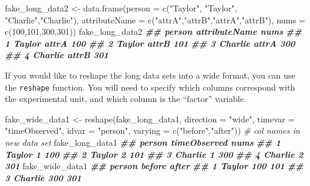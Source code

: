 \documentclass[
  12pt,
]{krantz}
\makeatletter
\newenvironment{Shaded}{\begin{snugshade}}{\end{snugshade}}
\newcommand{\AttributeTok}[1]{\textcolor[rgb]{0.61,0.61,0.61}{#1}}
\newcommand{\CommentTok}[1]{\textcolor[rgb]{0.37,0.37,0.37}{\textit{#1}}}
\newcommand{\DecValTok}[1]{\textcolor[rgb]{0.06,0.06,0.06}{#1}}
\newcommand{\DocumentationTok}[1]{\textcolor[rgb]{0.37,0.37,0.37}{\textbf{\textit{#1}}}}
\newcommand{\FunctionTok}[1]{\textcolor[rgb]{0,0,0}{#1}}
\newcommand{\NormalTok}[1]{#1}
\newcommand{\OtherTok}[1]{\textcolor[rgb]{0.37,0.37,0.37}{#1}}
\newcommand{\StringTok}[1]{\textcolor[rgb]{0.5,0.5,0.5}{#1}}
\newenvironment{kframe}{%
\medskip{}
\setlength{\fboxsep}{.8em}
 \def\at@end@of@kframe{}%
 \ifinner\ifhmode%
  \def\at@end@of@kframe{\end{minipage}}%
  \begin{minipage}{\columnwidth}%
 \fi\fi%
 \def\FrameCommand##1{\hskip\@totalleftmargin \hskip-\fboxsep
 \colorbox{shadecolor}{##1}\hskip-\fboxsep
     \hskip-\linewidth \hskip-\@totalleftmargin \hskip\columnwidth}%
 \MakeFramed {\advance\hsize-\width
   \@totalleftmargin\z@ \linewidth\hsize
   \@setminipage}}%
 {\par\unskip\endMakeFramed%
 \at@end@of@kframe}
\renewenvironment{Shaded}{\begin{kframe}}{\end{kframe}}
\makeatother
\begin{document}
\begin{Shaded}
\begin{Highlighting}[]
\NormalTok{fake\_long\_data2 }\OtherTok{\textless{}{-}} \FunctionTok{data.frame}\NormalTok{(}\AttributeTok{person =} \FunctionTok{c}\NormalTok{(}\StringTok{"Taylor"}\NormalTok{, }\StringTok{"Taylor"}\NormalTok{, }\StringTok{"Charlie"}\NormalTok{,}\StringTok{"Charlie"}\NormalTok{), }
                             \AttributeTok{attributeName =} \FunctionTok{c}\NormalTok{(}\StringTok{"attrA"}\NormalTok{,}\StringTok{"attrB"}\NormalTok{,}\StringTok{"attrA"}\NormalTok{,}\StringTok{"attrB"}\NormalTok{),}
                             \AttributeTok{nums =} \FunctionTok{c}\NormalTok{(}\DecValTok{100}\NormalTok{,}\DecValTok{101}\NormalTok{,}\DecValTok{300}\NormalTok{,}\DecValTok{301}\NormalTok{))}
\NormalTok{fake\_long\_data2}
\DocumentationTok{\#\#    person attributeName nums}
\DocumentationTok{\#\# 1  Taylor         attrA  100}
\DocumentationTok{\#\# 2  Taylor         attrB  101}
\DocumentationTok{\#\# 3 Charlie         attrA  300}
\DocumentationTok{\#\# 4 Charlie         attrB  301}
\end{Highlighting}
\end{Shaded}

If you would like to reshape the long data sets into a wide format, you can use the \texttt{reshape} function. You will need to specify which columns correspond with the experimental unit, and which column is the ``factor'' variable.

\begin{Shaded}
\begin{Highlighting}[]
\NormalTok{fake\_wide\_data1 }\OtherTok{\textless{}{-}} \FunctionTok{reshape}\NormalTok{(fake\_long\_data1, }
                           \AttributeTok{direction =} \StringTok{"wide"}\NormalTok{, }
                           \AttributeTok{timevar =} \StringTok{"timeObserved"}\NormalTok{, }
                           \AttributeTok{idvar =} \StringTok{"person"}\NormalTok{, }
                           \AttributeTok{varying =} \FunctionTok{c}\NormalTok{(}\StringTok{"before"}\NormalTok{,}\StringTok{"after"}\NormalTok{)) }\CommentTok{\# col names in new data set}
\NormalTok{fake\_long\_data1}
\DocumentationTok{\#\#    person timeObserved nums}
\DocumentationTok{\#\# 1  Taylor            1  100}
\DocumentationTok{\#\# 2  Taylor            2  101}
\DocumentationTok{\#\# 3 Charlie            1  300}
\DocumentationTok{\#\# 4 Charlie            2  301}
\NormalTok{fake\_wide\_data1}
\DocumentationTok{\#\#    person before after}
\DocumentationTok{\#\# 1  Taylor    100   101}
\DocumentationTok{\#\# 3 Charlie    300   301}
\end{Highlighting}
\end{Shaded}
\end{document}
